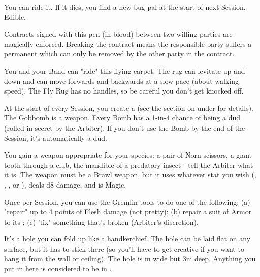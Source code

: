 \begin{multicols*}{2}
You can ride it. If it dies, you find a new bug pal at the start of next Session.  Edible.


Contracts signed with this pen (in blood) between two willing parties are magically enforced. Breaking the contract means the responsible party suffers a permanent  which can only be removed by the other party in the contract.


You and your Band can "ride" this flying carpet.  The rug can levitate up and down and can move forwards and backwards at a slow pace (about walking speed).  The Fly Rug has no handles, so be careful you don't get knocked off.


At the start of every Session, you create a  (see the section on  under  for details). The Gobbomb is a \DEX weapon. Every Bomb has a 1-in-4 chance of being a dud (rolled in secret by the Arbiter).  If you don't use the Bomb by the end of the Session, it's automatically a dud.


You gain a weapon appropriate for your species: a pair of Norn scissors, a giant tooth through a club, the mandible of a predatory insect - tell the Arbiter what it is.  The weapon must be a Brawl weapon, but it uses whatever stat you wish (\VIG, \DEX, \INT, or \FOC), deals d8 damage, and is Magic.

\cbreak


Once per Session, you can use the Gremlin tools to do one of the following:  (a) "repair" up to 4 points of Flesh damage (not pretty); (b) repair a suit of Armor to its \MAX; (c) "fix" something that's broken (Arbiter's discretion).




It's a hole you can fold up like a handkerchief.  The hole can be laid flat on any surface, but it has to stick there (so you'll have to get creative if you want to hang it from the wall or ceiling).  The hole is \OneHalf m wide but 3m deep.  Anything you put in here is considered to be in .



\end{multicols*}
